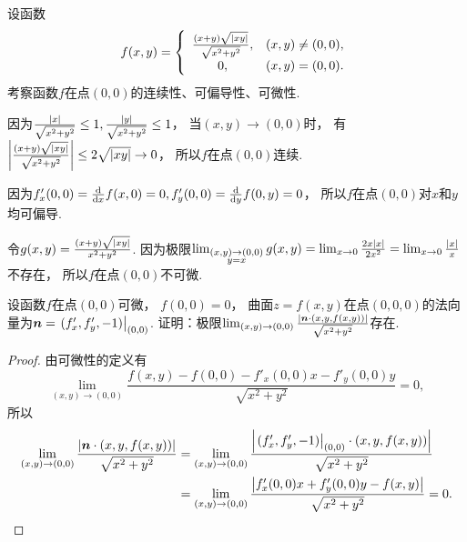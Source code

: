 \begin{example}
设函数\begin{equation*}
	f(x,y) = \left\{ \begin{array}{cl}
		\frac{(x+y) \sqrt{\abs{xy}}}{\sqrt{x^2+y^2}}, & (x,y)\neq(0,0), \\
		0, & (x,y)=(0,0).
	\end{array} \right.
\end{equation*}
考察函数\(f\)在点\((0,0)\)的连续性、可偏导性、可微性.
\begin{solution}
因为\(\frac{\abs{x}}{\sqrt{x^2+y^2}} \leq 1,
\frac{\abs{y}}{\sqrt{x^2+y^2}} \leq 1\)，
当\((x,y)\to(0,0)\)时，
有\(\abs{\frac{(x+y) \sqrt{\abs{xy}}}{\sqrt{x^2+y^2}}}
\leq 2 \sqrt{\abs{xy}}
\to 0\)，
所以\(f\)在点\((0,0)\)连续.

因为\(f'_x(0,0) = \dv{x} f(x,0) = 0,
f'_y(0,0) = \dv{y} f(0,y) = 0\)，
所以\(f\)在点\((0,0)\)对\(x\)和\(y\)均可偏导.

令\(g(x,y) = \frac{(x+y) \sqrt{\abs{xy}}}{x^2+y^2}\).
因为极限\(\lim_{\substack{(x,y)\to(0,0) \\ y=x}} g(x,y)
= \lim_{x\to0} \frac{2x \abs{x}}{2x^2}
= \lim_{x\to0} \frac{\abs{x}}{x}\)不存在，
所以\(f\)在点\((0,0)\)不可微.
\end{solution}
\end{example}

\begin{example}
设函数\(f\)在点\((0,0)\)可微，
\(f(0,0) = 0\)，
曲面\(z = f(x,y)\)在点\((0,0,0)\)的法向量为\(\vb{n} = \eval{(f'_x,f'_y,-1)}_{(0,0)}\).
证明：极限\(
	\lim_{(x,y)\to(0,0)} \frac{\abs{\boldsymbol{n} \cdot (x,y,f(x,y))}}{\sqrt{x^2+y^2}}
\)存在.
\begin{proof}
由可微性的定义有\begin{equation*}
	\lim_{(x,y)\to(0,0)} \frac{
		f(x,y) - f(0,0)
		- f'_x(0,0) x
		- f'_y(0,0) y
	}{
		\sqrt{x^2+y^2}
	}
	= 0,
\end{equation*}
所以\begin{align*}
	\lim_{(x,y)\to(0,0)} \frac{\abs{\vb{n} \cdot (x,y,f(x,y))}}{\sqrt{x^2+y^2}}
	&= \lim_{(x,y)\to(0,0)} \frac{
		\abs{
			\eval{(f'_x,f'_y,-1)}_{(0,0)}
			\cdot
			(x,y,f(x,y))
		}
	}{
		\sqrt{x^2+y^2}
	} \\
	&= \lim_{(x,y)\to(0,0)} \frac{
		\abs{
			f'_x(0,0) x + f'_y(0,0) y - f(x,y)
		}
	}{
		\sqrt{x^2+y^2}
	}
	= 0.
	\qedhere
\end{align*}
\end{proof}
\end{example}

